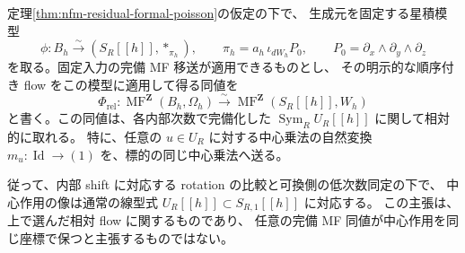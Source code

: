 \begin{lemma}
\label{lem:nfm-relative-center-transport}
定理\ref{thm:nfm-residual-formal-poisson}の仮定の下で、
生成元を固定する星積模型
\[
 \phi:B_h\xrightarrow{\sim}(S_R[[h]],*_{\pi_h}),\qquad
 \pi_h=a_h\,\iota_{dW_h}P_0,
 \qquad P_0=\partial_x\wedge\partial_y\wedge\partial_z
\]
を取る。固定入力の完備 MF 移送が適用できるものとし、
その明示的な順序付き flow をこの模型に適用して得る同値を
\[
 \Phi_{\mathrm{rel}}:
 \operatorname{MF}^{\mathbf Z}(B_h,\Omega_h)
 \xrightarrow{\sim}
 \operatorname{MF}^{\mathbf Z}(S_R[[h]],W_h)
\]
と書く。この同値は、各内部次数で完備化した
$\operatorname{Sym}_R U_R[[h]]$ に関して相対的に取れる。
特に、任意の $u\in U_R$ に対する中心乗法の自然変換
$m_u:\operatorname{Id}\to(1)$ を、標的の同じ中心乗法へ送る。

従って、内部 shift に対応する rotation の比較と可換側の低次数同定の下で、
中心作用の像は通常の線型式 $U_R[[h]]\subset S_{R,1}[[h]]$ に対応する。
この主張は、上で選んだ相対 flow に関するものであり、
任意の完備 MF 同値が中心作用を同じ座標で保つと主張するものではない。
\end{lemma}


